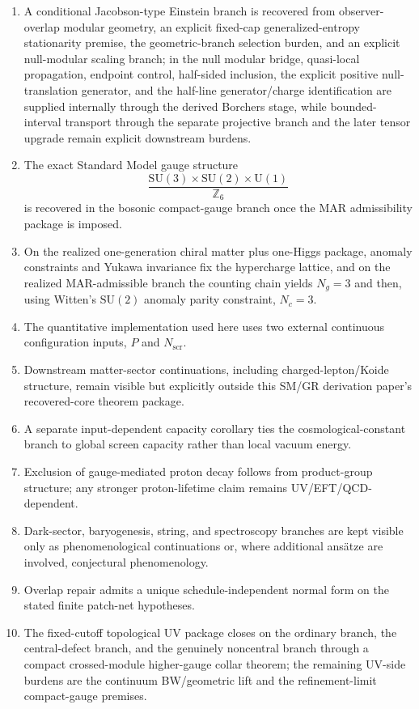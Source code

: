 \documentclass[11pt]{article}
\newcommand{\SU}{\mathrm{SU}}
\newcommand{\U}{\mathrm{U}}
\begin{document}
\begin{enumerate}[leftmargin=2em]
\item A conditional Jacobson-type Einstein branch is recovered from observer-overlap modular geometry, an explicit fixed-cap generalized-entropy stationarity premise, the geometric-branch selection burden, and an explicit null-modular scaling branch; in the null modular bridge, quasi-local propagation, endpoint control, half-sided inclusion, the explicit positive null-translation generator, and the half-line generator/charge identification are supplied internally through the derived Borchers stage, while bounded-interval transport through the separate projective branch and the later tensor upgrade remain explicit downstream burdens.
\item The exact Standard Model gauge structure
\[
\frac{\SU(3)\times\SU(2)\times\U(1)}{\mathbb Z_6}
\]
is recovered in the bosonic compact-gauge branch once the MAR admissibility package is imposed.
\item On the realized one-generation chiral matter plus one-Higgs package, anomaly constraints and Yukawa invariance fix the hypercharge lattice, and on the realized MAR-admissible branch the counting chain yields \(N_g=3\) and then, using Witten's \(\SU(2)\) anomaly parity constraint, \(N_c=3\).
\item The quantitative implementation used here uses two external continuous configuration inputs, $P$ and $N_{\mathrm{scr}}$.
\item Downstream matter-sector continuations, including charged-lepton/Koide structure, remain visible but explicitly outside this SM/GR derivation paper's recovered-core theorem package.
\item A separate input-dependent capacity corollary ties the cosmological-constant branch to global screen capacity rather than local vacuum energy.
\item Exclusion of gauge-mediated proton decay follows from product-group structure; any stronger proton-lifetime claim remains UV/EFT/QCD-dependent.
\item Dark-sector, baryogenesis, string, and spectroscopy branches are kept visible only as phenomenological continuations or, where additional ans\"atze are involved, conjectural phenomenology.
\item Overlap repair admits a unique schedule-independent normal form on the stated finite patch-net hypotheses.
\item The fixed-cutoff topological UV package closes on the ordinary branch, the central-defect branch, and the genuinely noncentral branch through a compact crossed-module higher-gauge collar theorem; the remaining UV-side burdens are the continuum BW/geometric lift and the refinement-limit compact-gauge premises.
\end{enumerate}
\end{document}
